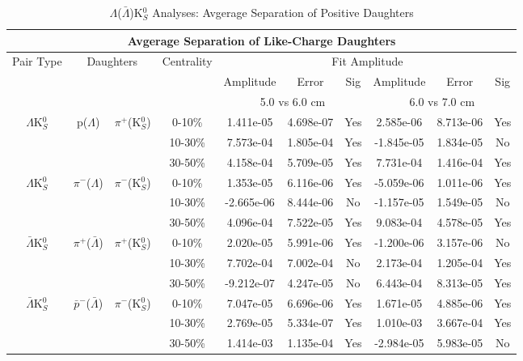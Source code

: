 \documentclass[../AnalysisNoteJBuxton.tex]{subfiles}
\begin{document}
\begin{table}
 \centering
 \begin{tabular}{|c|c|c|c|c|c|c||c|c|c|}
 \multicolumn{10}{c}{Avgerage Separation of Like-Charge Daughters} \\
  \hline
  \multirow{3}{*}{Pair Type} & \multicolumn{2}{c|}{\multirow{3}{*}{Daughters}} & \multirow{3}{*}{Centrality} & \multicolumn{6}{c|}{Fit Amplitude} \\
  \cline{5-10}
   & \multicolumn{2}{c|}{} & & Amplitude & Error & Sig & Amplitude & Error & Sig \\  
  \cline{5-10}
   & \multicolumn{2}{c|}{} & & \multicolumn{3}{c||}{5.0 vs 6.0 cm} & \multicolumn{3}{c|}{6.0 vs 7.0 cm} \\  
  \hline
  \multirow{3}{*}{$\Lambda$K$^{0}_{S}$} & \multirow{3}{*}{p($\Lambda$)} & \multirow{3}{*}{$\pi^{+}$(K$^{0}_{S}$)}
   &      0-10\% & 1.411e-05 & 4.698e-07 & Yes & 2.585e-06 & 8.713e-06 & Yes \\
   & & & 10-30\% & 7.573e-04 & 1.805e-04 & Yes & -1.845e-05 & 1.834e-05 & No \\
   & & & 30-50\% & 4.158e-04 & 5.709e-05 & Yes & 7.731e-04 & 1.416e-04 & Yes \\
  \hline
  \multirow{3}{*}{$\Lambda$K$^{0}_{S}$} & \multirow{3}{*}{$\pi^{-}$($\Lambda$)} & \multirow{3}{*}{$\pi^{-}$(K$^{0}_{S}$) }
   &      0-10\% & 1.353e-05 & 6.116e-06 & Yes & -5.059e-06 & 1.011e-06 & Yes \\
   & & & 10-30\% & -2.665e-06 & 8.444e-06 & No & -1.157e-05 & 1.549e-05 & No \\
   & & & 30-50\% & 4.096e-04 & 7.522e-05 & Yes & 9.083e-04 & 4.578e-05 & Yes \\
  \hline \hline
  \multirow{3}{*}{$\bar{\Lambda}$K$^{0}_{S}$} & \multirow{3}{*}{$\pi^{+}$($\bar{\Lambda}$)} & \multirow{3}{*}{$\pi^{+}$(K$^{0}_{S}$)} 
   &      0-10\% & 2.020e-05 & 5.991e-06 & Yes & -1.200e-06 & 3.157e-06 & No \\ 
   & & & 10-30\% & 7.702e-04 & 7.002e-04 & No & 2.173e-04 & 1.205e-04 & Yes \\
   & & & 30-50\% & -9.212e-07 & 4.247e-05 & No & 6.443e-04 & 8.313e-05 & Yes \\
  \hline
  \multirow{3}{*}{$\bar{\Lambda}$K$^{0}_{S}$} & \multirow{3}{*}{$\bar{p}^{-}$($\bar{\Lambda}$)} & \multirow{3}{*}{$\pi^{-}$(K$^{0}_{S}$)}
   &      0-10\% & 7.047e-05 & 6.696e-06 & Yes & 1.671e-05 & 4.885e-06 & Yes \\
   & & & 10-30\% & 2.769e-05 & 5.334e-07 & Yes & 1.010e-03 & 3.667e-04 & Yes \\
   & & & 30-50\% & 1.414e-03 & 1.135e-04 & Yes & -2.984e-05 & 5.983e-05 & No \\
  \hline
 \end{tabular}
 \caption{$\Lambda$($\bar{\Lambda}$)K$^{0}_{S}$ Analyses: Avgerage Separation of Positive Daughters}
 \label{tab:AvgSepLamK0}
\end{table}
\end{document}
